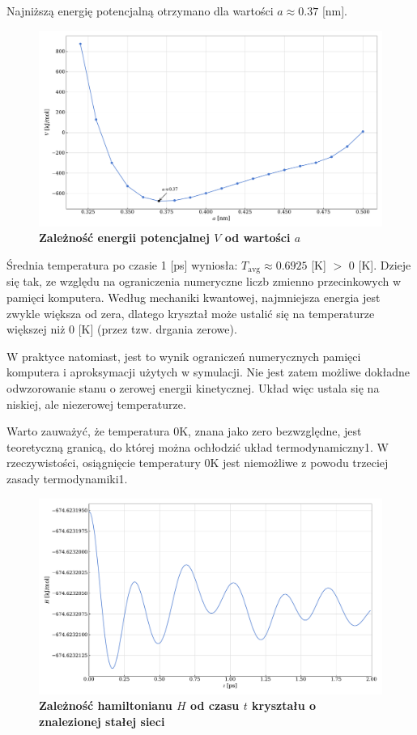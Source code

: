 \documentclass[11pt,a4paper]{article}
\begin{document}
Najniższą energię potencjalną otrzymano dla wartości $a\approx0.37$ [nm].

\begin{figure}[ht!]
    \caption{\textbf{Zależność energii potencjalnej $V$ od wartości $a$}}
    \vspace{0.2cm}
    \includegraphics[width=\textwidth]{../figures/plot_V_vs_a.pdf}
\end{figure}

Średnia temperatura po czasie 1 [ps] wyniosła: $T_{\text{avg}}\approx0.6925$ [K] $>$ 0 [K]. Dzieje się tak, ze względu na ograniczenia numeryczne liczb zmienno przecinkowych w pamięci komputera. Według mechaniki kwantowej, najmniejsza energia jest zwykle większa od zera, dlatego kryształ może ustalić się na temperaturze większej niż 0 [K] (przez tzw. drgania zerowe).

W praktyce natomiast, jest to wynik ograniczeń numerycznych pamięci komputera i aproksymacji użytych w symulacji. Nie jest zatem możliwe dokładne odwzorowanie stanu o zerowej energii kinetycznej. Układ więc ustala się na niskiej, ale niezerowej temperaturze.

Warto zauważyć, że temperatura 0K, znana jako zero bezwzględne, jest teoretyczną granicą, do której można ochłodzić układ termodynamiczny1. W rzeczywistości, osiągnięcie temperatury 0K jest niemożliwe z powodu trzeciej zasady termodynamiki1.

\begin{figure}[ht!]
    \caption{\textbf{Zależność hamiltonianu $H$ od czasu $t$ kryształu o znalezionej stałej sieci}}
    \vspace{0.2cm}
    \includegraphics[width=\textwidth]{../figures/crystal_stability.pdf}
\end{figure}
\pagebreak
\end{document}
